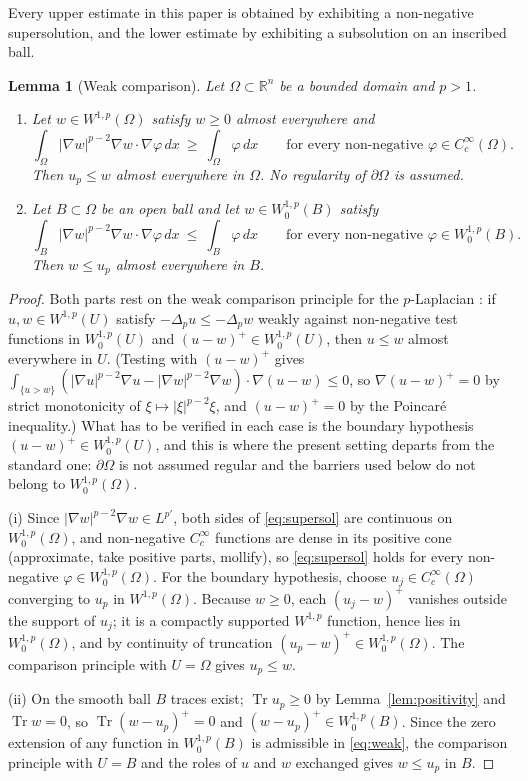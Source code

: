 \documentclass[11pt]{article}
\newcommand{\R}{\mathbb R}
\newcommand{\abs}[1]{\lvert #1\rvert}
\newcommand{\Tr}{\operatorname{Tr}}
\newtheorem{lemma}[theorem]{Lemma}
\theoremstyle{definition}
\theoremstyle{remark}
\begin{document}
Every upper estimate in this paper is obtained by exhibiting a non-negative supersolution, and the lower estimate by exhibiting a subsolution on an
inscribed ball. 
\begin{lemma}[Weak comparison]\label{lem:comparison}
Let $\Omega\subset\R^n$ be a bounded domain and $p>1$.
\begin{enumerate}
\item[(i)] Let $w\in W^{1,p}(\Omega)$ satisfy $w\ge0$ almost everywhere and
\begin{equation}\label{eq:supersol}
\int_\Omega\abs{\nabla w}^{p-2}\nabla w\cdot\nabla\varphi\,dx
\ \ge\ \int_\Omega\varphi\,dx
\qquad\text{for every non-negative }\varphi\in C_c^\infty(\Omega).
\end{equation}
Then $u_p\le w$ almost everywhere in $\Omega$. No regularity of
$\partial\Omega$ is assumed.
\item[(ii)] Let $B\subset\Omega$ be an open ball and let $w\in W^{1,p}_0(B)$
satisfy
\[
\int_B\abs{\nabla w}^{p-2}\nabla w\cdot\nabla\varphi\,dx
\ \le\ \int_B\varphi\,dx
\qquad\text{for every non-negative }\varphi\in W^{1,p}_0(B).
\]
Then $w\le u_p$ almost everywhere in $B$.
\end{enumerate}
\end{lemma}
\begin{proof}
Both parts rest on the weak comparison principle for the $p$-Laplacian
\cite[Chapter~3]{Lin}: if $u,w\in W^{1,p}(U)$ satisfy
$-\Delta_pu\le-\Delta_pw$ weakly against non-negative test functions in
$W^{1,p}_0(U)$ and $(u-w)^+\in W^{1,p}_0(U)$, then $u\le w$ almost everywhere
in $U$. (Testing with $(u-w)^+$ gives
$\int_{\{u>w\}}(\abs{\nabla u}^{p-2}\nabla u-\abs{\nabla w}^{p-2}\nabla w)
\cdot\nabla(u-w)\le0$, so $\nabla(u-w)^+=0$ by strict monotonicity of
$\xi\mapsto\abs\xi^{p-2}\xi$, and $(u-w)^+=0$ by the Poincar\'e inequality.)
What has to be verified in each case is the boundary hypothesis
$(u-w)^+\in W^{1,p}_0(U)$, and this is where the present setting departs
from the standard one: $\partial\Omega$ is not assumed regular and the
barriers used below do not belong to $W^{1,p}_0(\Omega)$.

(i) Since $\abs{\nabla w}^{p-2}\nabla w\in L^{p'}$, both sides of
\eqref{eq:supersol} are continuous on $W^{1,p}_0(\Omega)$, and non-negative
$C_c^\infty$ functions are dense in its positive cone (approximate, take
positive parts, mollify), so \eqref{eq:supersol} holds for every non-negative
$\varphi\in W^{1,p}_0(\Omega)$. For the boundary hypothesis, choose
$u_j\in C_c^\infty(\Omega)$ converging to $u_p$ in $W^{1,p}(\Omega)$. Because
$w\ge0$, each $(u_j-w)^+$ vanishes outside the support of $u_j$; it is a
compactly supported $W^{1,p}$ function, hence lies in $W^{1,p}_0(\Omega)$, and
by continuity of truncation $(u_p-w)^+\in W^{1,p}_0(\Omega)$. The comparison
principle with $U=\Omega$ gives $u_p\le w$.

(ii) On the smooth ball $B$ traces exist; $\Tr u_p\ge0$ by
Lemma~\ref{lem:positivity} and $\Tr w=0$, so $\Tr(w-u_p)^+=0$ and
$(w-u_p)^+\in W^{1,p}_0(B)$. Since the zero extension of any function in
$W^{1,p}_0(B)$ is admissible in \eqref{eq:weak}, the comparison principle
with $U=B$ and the roles of $u$ and $w$ exchanged gives $w\le u_p$ in $B$.
\end{proof}
\end{document}
